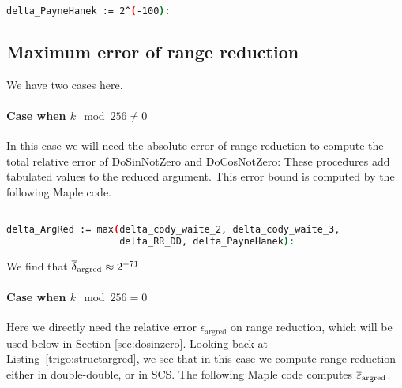 \begin{lstlisting}[caption={Payne and Hanek error},
  language={sh}, numbers=none]% of course it's maple
%Skip a line here, I don't know why, otherwise latex eats the first line

delta_PayneHanek := 2^(-100):
\end{lstlisting}


\subsection{Maximum error of range reduction }

We have two cases here.

\paragraph*{Case when $k\mod 256\ne 0$}

In this case we will need the absolute error of range reduction to compute the
total relative error of DoSinNotZero and
DoCosNotZero: These procedures add tabulated values to the
reduced argument. This error bound is computed by the following Maple code.

\begin{lstlisting}[caption={Maple script computing the absolute error bound of range reduction}, firstnumber=1,
  language={sh}, numbers=none]% of course it's maple
%Skip a line here, I don't know why, otherwise latex eats the first line

delta_ArgRed := max(delta_cody_waite_2, delta_cody_waite_3,
                    delta_RR_DD, delta_PayneHanek):
\end{lstlisting}

We find that ${\overline{\delta}}_{\mathrm{argred}}\approx 2^{-71}$


\paragraph*{Case when $k\mod 256= 0$}

Here we directly need the relative error $\epsilon_{\mathrm{argred}}$
on range reduction, which will be used below in Section
\ref{sec:dosinzero}. Looking back at Listing~\ref{trigo:structargred}, we
see that in this case we compute range reduction either in
double-double, or in SCS. The following Maple code computes
${\overline{\varepsilon}}_{\mathrm{argred}}$.

